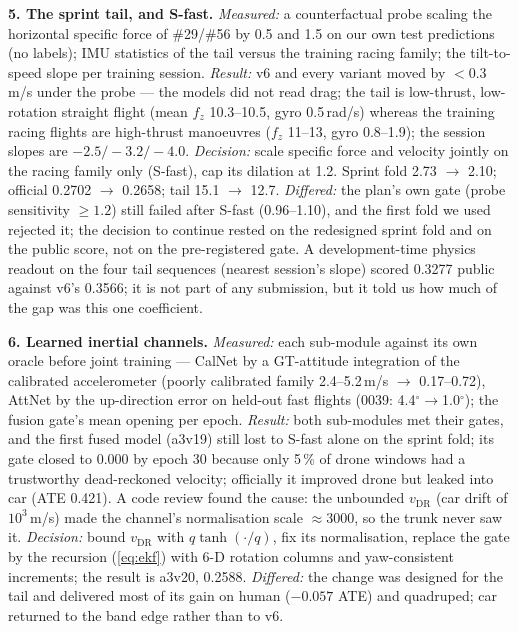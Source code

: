 \documentclass[letterpaper,10pt,conference]{ieeeconf}
\newcommand{\vdr}{v_{\mathrm{DR}}}
\begin{document}
\textbf{5. The sprint tail, and S-fast.} \emph{Measured:} a counterfactual probe scaling the
horizontal specific force of \#29/\#56 by 0.5 and 1.5 on our own test predictions (no labels);
IMU statistics of the tail versus the training racing family; the tilt-to-speed slope per training
session. \emph{Result:} v6 and every variant moved by $<0.3$\,m/s under the probe --- the models
did not read drag; the tail is low-thrust, low-rotation straight flight (mean $f_z$ 10.3--10.5,
gyro 0.5\,rad/s) whereas the training racing flights are high-thrust manoeuvres ($f_z$ 11--13,
gyro 0.8--1.9); the session slopes are $-2.5/-3.2/-4.0$. \emph{Decision:} scale specific force
and velocity jointly on the racing family only (S-fast), cap its dilation at 1.2. Sprint fold
2.73 $\to$ 2.10; official 0.2702 $\to$ 0.2658; tail 15.1 $\to$ 12.7. \emph{Differed:} the plan's
own gate (probe sensitivity $\ge1.2$) still failed after S-fast (0.96--1.10), and the first fold
we used rejected it; the decision to continue rested on the redesigned sprint fold and on the
public score, not on the pre-registered gate. A development-time physics readout on the four tail
sequences (nearest session's slope) scored 0.3277 public against v6's 0.3566; it is not part of any
submission, but it told us how much of the gap was this one coefficient.

\textbf{6. Learned inertial channels.} \emph{Measured:} each sub-module against its own oracle
before joint training --- CalNet by a GT-attitude integration of the calibrated accelerometer
(poorly calibrated family 2.4--5.2\,m/s $\to$ 0.17--0.72), AttNet by the up-direction error on
held-out fast flights (0039: 4.4$^\circ\to$1.0$^\circ$); the fusion gate's mean opening per epoch.
\emph{Result:} both sub-modules met their gates, and the first fused model (a3v19) still lost to
S-fast alone on the sprint fold; its gate closed to 0.000 by epoch 30 because only 5\,\% of drone
windows had a trustworthy dead-reckoned velocity; officially it improved drone but leaked into
car (ATE 0.421). A code review found the cause: the unbounded $\vdr$ (car drift of $10^3$\,m/s)
made the channel's normalisation scale $\approx$3000, so the trunk never saw it. \emph{Decision:}
bound $\vdr$ with $q\tanh(\cdot/q)$, fix its normalisation, replace the gate by the recursion
(\ref{eq:ekf}) with 6-D rotation columns and yaw-consistent increments; the result is a3v20,
0.2588. \emph{Differed:} the change was designed for the tail and delivered most of its gain on
human ($-0.057$ ATE) and quadruped; car returned to the band edge rather than to v6.
\end{document}
